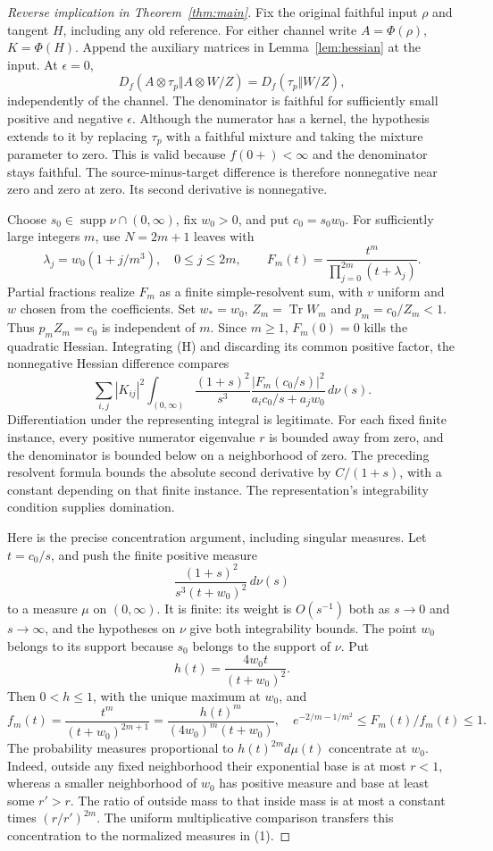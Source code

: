 \documentclass[11pt]{article}
\newcommand{\Tr}{\operatorname{Tr}}
\begin{document}
\begin{proof}[Reverse implication in Theorem~\ref{thm:main}]
Fix the original faithful input $\rho$ and tangent $H$, including any old reference. For either channel write $A=\Phi(\rho)$, $K=\Phi(H)$. Append the auxiliary matrices in Lemma~\ref{lem:hessian} at the input. At $\epsilon=0$,
\[
 D_f(A\otimes\tau_p\Vert A\otimes W/Z)=D_f(\tau_p\Vert W/Z),
\]
independently of the channel. The denominator is faithful for sufficiently small positive and negative $\epsilon$. Although the numerator has a kernel, the hypothesis extends to it by replacing $\tau_p$ with a faithful mixture and taking the mixture parameter to zero. This is valid because $f(0+)<\infty$ and the denominator stays faithful. The source-minus-target difference is therefore nonnegative near zero and zero at zero. Its second derivative is nonnegative.

Choose $s_0\in\operatorname{supp}\nu\cap(0,\infty)$, fix $w_0>0$, and put $c_0=s_0w_0$. For sufficiently large integers $m$, use $N=2m+1$ leaves with
\[
 \lambda_j=w_0(1+j/m^3),\quad 0\leq j\leq2m,\qquad
 F_m(t)=\frac{t^m}{\prod_{j=0}^{2m}(t+\lambda_j)}.
\]
Partial fractions realize $F_m$ as a finite simple-resolvent sum, with $v$ uniform and $w$ chosen from the coefficients. Set $w_*=w_0$, $Z_m=\Tr W_m$ and $p_m=c_0/Z_m<1$. Thus $p_mZ_m=c_0$ is independent of $m$. Since $m\geq1$, $F_m(0)=0$ kills the quadratic Hessian. Integrating (H) and discarding its common positive factor, the nonnegative Hessian difference compares
\[
 \sum_{i,j}|K_{ij}|^2
 \int_{(0,\infty)}\frac{(1+s)^2}{s^3}
 \frac{|F_m(c_0/s)|^2}{a_i c_0/s+a_jw_0}\,d\nu(s). \tag{1}
\]
Differentiation under the representing integral is legitimate. For each fixed finite instance, every positive numerator eigenvalue $r$ is bounded away from zero, and the denominator is bounded below on a neighborhood of zero. The preceding resolvent formula bounds the absolute second derivative by $C/(1+s)$, with a constant depending on that finite instance. The representation's integrability condition supplies domination.

Here is the precise concentration argument, including singular measures. Let $t=c_0/s$, and push the finite positive measure
\[
 \frac{(1+s)^2}{s^3(t+w_0)^2}\,d\nu(s)
\]
to a measure $\mu$ on $(0,\infty)$. It is finite: its weight is $O(s^{-1})$ both as $s\to0$ and $s\to\infty$, and the hypotheses on $\nu$ give both integrability bounds. The point $w_0$ belongs to its support because $s_0$ belongs to the support of $\nu$. Put
\[
 h(t)=\frac{4w_0t}{(t+w_0)^2}.
\]
Then $0<h\leq1$, with the unique maximum at $w_0$, and
\[
 f_m(t)=\frac{t^m}{(t+w_0)^{2m+1}}
       =\frac{h(t)^m}{(4w_0)^m(t+w_0)},\quad
 e^{-2/m-1/m^2}\leq F_m(t)/f_m(t)\leq1.
\]
The probability measures proportional to $h(t)^{2m}d\mu(t)$ concentrate at $w_0$. Indeed, outside any fixed neighborhood their exponential base is at most $r<1$, whereas a smaller neighborhood of $w_0$ has positive measure and base at least some $r'>r$. The ratio of outside mass to that inside mass is at most a constant times $(r/r')^{2m}$. The uniform multiplicative comparison transfers this concentration to the normalized measures in (1).


\end{proof}
\end{document}
